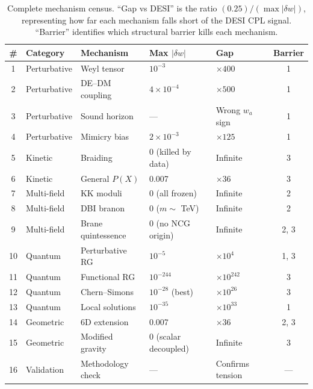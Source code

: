 \begin{table}[htbp]
\centering
\caption{Complete mechanism census. ``Gap vs DESI'' is the ratio $(0.25)/({\max |\delta w|})$, representing how far each mechanism falls short of the DESI CPL signal. ``Barrier'' identifies which structural barrier kills each mechanism.}
\label{tab:3-census}
\small
\begin{tabular}{@{}cllllc@{}}
\toprule
\# & Category & Mechanism & Max $|\delta w|$ & Gap & Barrier \\
\midrule
1  & Perturbative & Weyl tensor        & $10^{-3}$               & $\times 400$        & 1     \\
2  & Perturbative & DE--DM coupling    & $4 \times 10^{-4}$      & $\times 500$        & 1     \\
3  & Perturbative & Sound horizon      & ---                     & Wrong $w_a$ sign    & 1     \\
4  & Perturbative & Mimicry bias       & $2 \times 10^{-3}$      & $\times 125$        & 1     \\
5  & Kinetic      & Braiding           & 0 (killed by data)      & Infinite            & 3     \\
6  & Kinetic      & General $P(X)$     & 0.007                   & $\times 36$         & 3     \\
7  & Multi-field  & KK moduli          & 0 (all frozen)          & Infinite            & 2     \\
8  & Multi-field  & DBI branon          & 0 ($m \sim$ TeV)       & Infinite            & 2     \\
9  & Multi-field  & Brane quintessence & 0 (no NCG origin)       & Infinite            & 2, 3  \\
10 & Quantum      & Perturbative RG    & $10^{-5}$               & $\times 10^4$       & 1, 3  \\
11 & Quantum      & Functional RG      & $10^{-244}$             & $\times 10^{242}$   & 3     \\
12 & Quantum      & Chern--Simons      & $10^{-28}$ (best)       & $\times 10^{26}$    & 3     \\
13 & Quantum      & Local solutions    & $10^{-35}$              & $\times 10^{33}$    & 1     \\
14 & Geometric    & 6D extension       & 0.007                   & $\times 36$         & 2, 3  \\
15 & Geometric    & Modified gravity   & 0 (scalar decoupled)    & Infinite            & 3     \\
16 & Validation   & Methodology check  & ---                     & Confirms tension    & ---   \\
\bottomrule
\end{tabular}
\end{table}

